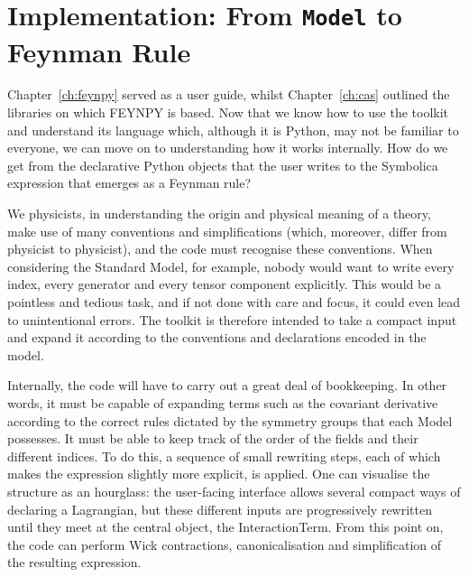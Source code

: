
\chapter{Implementation: From \texttt{Model} to Feynman Rule}
\label{ch:internals}

Chapter~\ref{ch:feynpy} served as a user guide, whilst Chapter~\ref{ch:cas} outlined the libraries on which FEYNPY is based. Now that we know how to use the toolkit and understand its language which, although it is Python, may not be familiar to everyone, we can move on to understanding how it works internally. How do we get from the declarative Python objects that the user writes to the Symbolica expression that emerges as a Feynman rule?

We physicists, in understanding the origin and physical meaning of a theory, make use of many conventions and simplifications (which, moreover, differ from physicist to physicist), and the code must recognise these conventions. When considering the Standard Model, for example, nobody would want to write every index, every generator and every tensor component explicitly. This would be a pointless and tedious task, and if not done with care and focus, it could even lead to unintentional errors. The toolkit is therefore intended to take a compact input and expand it according to the conventions and declarations encoded in the model.

Internally, the code will have to carry out a great deal of bookkeeping. In other words, it must be capable of expanding terms such as the covariant derivative according to the correct rules dictated by the symmetry groups that each Model possesses. It must be able to keep track of the order of the fields and their different indices. To do this, a sequence of small rewriting steps, each of which makes the expression slightly more explicit, is applied. One can visualise the structure as an hourglass: the user-facing interface allows several compact ways of declaring a Lagrangian, but these different inputs are progressively rewritten until they meet at the central object, the InteractionTerm. From this point on, the code can perform Wick contractions, canonicalisation and simplification of the resulting expression.

